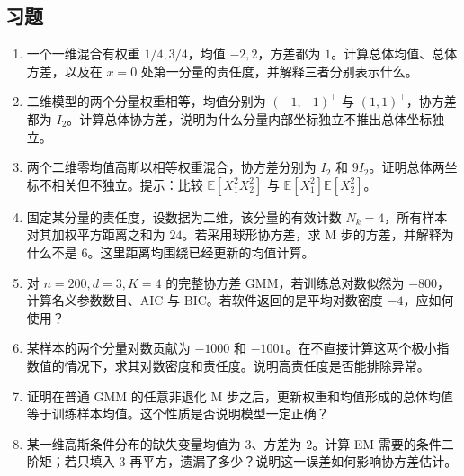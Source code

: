\documentclass[UTF8]{ctexart}
\begin{document}
\subsection{习题}
\begin{enumerate}
\item 一个一维混合有权重 $1/4,3/4$，均值 $-2,2$，方差都为 $1$。计算总体均值、总体方差，以及在 $x=0$ 处第一分量的责任度，并解释三者分别表示什么。
\item 二维模型的两个分量权重相等，均值分别为 $(-1,-1)^\top$ 与 $(1,1)^\top$，协方差都为 $I_2$。计算总体协方差，说明为什么分量内部坐标独立不推出总体坐标独立。
\item 两个二维零均值高斯以相等权重混合，协方差分别为 $I_2$ 和 $9I_2$。证明总体两坐标不相关但不独立。提示：比较 $\mathbb E[X_1^2X_2^2]$ 与 $\mathbb E[X_1^2]\mathbb E[X_2^2]$。
\item 固定某分量的责任度，设数据为二维，该分量的有效计数 $N_k=4$，所有样本对其加权平方距离之和为 $24$。若采用球形协方差，求 M 步的方差，并解释为什么不是 $6$。这里距离均围绕已经更新的均值计算。
\item 对 $n=200,d=3,K=4$ 的完整协方差 GMM，若训练总对数似然为 $-800$，计算名义参数数目、AIC 与 BIC。若软件返回的是平均对数密度 $-4$，应如何使用？
\item 某样本的两个分量对数贡献为 $-1000$ 和 $-1001$。在不直接计算这两个极小指数值的情况下，求其对数密度和责任度。说明高责任度是否能排除异常。
\item 证明在普通 GMM 的任意非退化 M 步之后，更新权重和均值形成的总体均值等于训练样本均值。这个性质是否说明模型一定正确？
\item 某一维高斯条件分布的缺失变量均值为 $3$、方差为 $2$。计算 EM 需要的条件二阶矩；若只填入 $3$ 再平方，遗漏了多少？说明这一误差如何影响协方差估计。
\end{enumerate}
\end{document}
